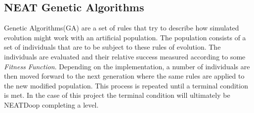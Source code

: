 \documentclass[]{Learning-to-Play-Wolfenstein-thesis}
\begin{document}
\subsection{\label{section2.5}NEAT Genetic Algorithms}
Genetic Algorithms(GA) are a set of rules that try to describe how simulated evolution might work with an artificial population. The population consists of a set of individuals that are to be subject to these rules of evolution. The individuals are evaluated and their relative success measured according to some \textit{Fitness Function}. Depending on the implementation, a number of individuals are then moved forward to the next generation where the same rules are applied to the new modified population. This process is repeated until a terminal condition is met. In the case of this project the terminal condition will ultimately be NEATDoop completing a level.
\end{document}
